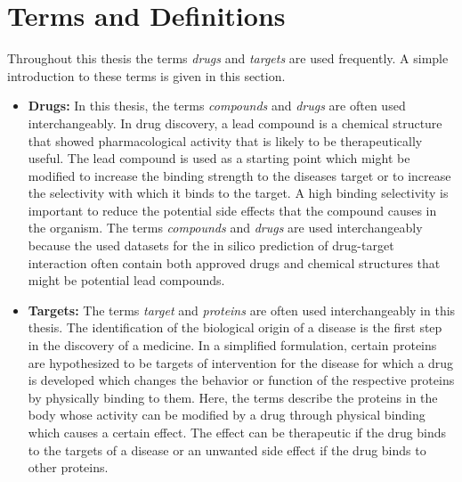 \section{Terms and Definitions}

Throughout this thesis the terms \textit{drugs} and \textit{targets} are used frequently. A simple introduction to these terms is given in this section.

\begin{itemize}
\item \textbf{Drugs:} In this thesis, the terms \textit{compounds} and \textit{drugs} are often used interchangeably. In drug discovery, a lead compound is a chemical structure that showed pharmacological activity that is likely to be therapeutically useful. The lead compound is used as a starting point which might be modified to increase the binding strength to the diseases target or to increase the selectivity with which it binds to the target. A high binding selectivity is important to reduce the potential side effects that the compound causes in the organism. The terms \textit{compounds} and \textit{drugs} are used interchangeably because the used datasets for the in silico prediction of drug-target interaction often contain both approved drugs and chemical structures that might be potential lead compounds. 
\item \textbf{Targets:} The terms \textit{target} and \textit{proteins} are often used interchangeably in this thesis. The identification of the biological origin of a disease is the first step in the discovery of a medicine. In a simplified formulation, certain proteins are hypothesized to be targets of intervention for the disease for which a drug is developed which changes the behavior or function of the respective proteins by physically binding to them. Here, the terms describe the proteins in the body whose activity can be modified by a drug through physical binding which causes a certain effect. The effect can be therapeutic if the drug binds to the targets of a disease or an unwanted side effect if the drug binds to other proteins.
\end{itemize}



